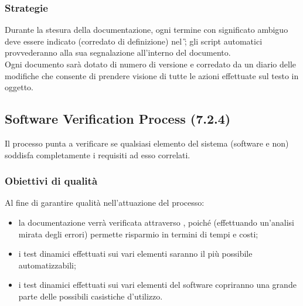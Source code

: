 \subsubsection{Strategie}
Durante la stesura della documentazione, ogni termine con significato ambiguo deve essere indicato (corredato di definizione) nel \G; gli script automatici provvederanno alla sua segnalazione all'interno del documento.\\
Ogni documento sarà dotato di numero di versione e corredato da un diario delle modifiche che consente di prendere visione di tutte le azioni effettuate sul testo in oggetto.
\subsection{Software Verification Process (7.2.4)}
\label{soVerification}
Il processo punta a verificare se qualsiasi elemento del sistema (software e non) soddisfa completamente i requisiti ad esso correlati.
\subsubsection{Obiettivi di qualità}
Al fine di garantire qualità nell'attuazione del processo:
\begin{itemize}
\item la documentazione verrà verificata attraverso \textit{}, poiché (effettuando un'analisi mirata degli errori) permette risparmio in termini di tempi e costi;
\item i test dinamici effettuati sui vari elementi saranno il più possibile automatizzabili;
\item i test dinamici effettuati sui vari elementi del software copriranno una grande parte delle possibili casistiche d'utilizzo.
\end{itemize}
